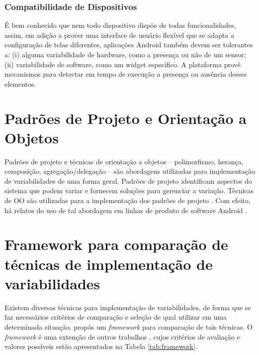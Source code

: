 \subsubsection{Compatibilidade de Dispositivos}

É bem conhecido que nem todo dispositivo dispõe de todas funcionalidades, assim,
em adição a prover uma interface de usuário flexível que se adapta a configuração
de telas diferentes, aplicações Android também devem ser tolerantes a: (i) alguma
variabilidade de hardware, como a presença ou não de um sensor; (ii) variabilidade
de software, como um widget específico. A plataforma provê mecanismos para detectar
em tempo de execução a presença ou ausência desses elementos.

\section{Padrões de Projeto e Orientação a Objetos}
Padrões de projeto \cite{Gamma1994} e técnicas de orientação a objetos – polimorfismo,
herança, composição, agregação/delegação – são abordagens utilizadas para implementação
de variabilidades de uma forma geral. Padrões de projeto identificam aspectos do sistema
que podem variar e fornecem soluções para gerenciar a variação. Técnicas de OO
são utilizadas para a implementação dos padrões de projeto \cite{Gacek2001}.
Com efeito, há relatos do uso de tal abordagem em linhas de produto de software Android \cite{Pavlic2013}.

\section{Framework para comparação de técnicas de implementação de variabilidades}
Existem diversas técnicas para implementação de variabilidades, de forma que se
faz necessários critérios de comparação e seleção de qual utilizar em uma determinada
situação.  propôs um \textit{framework} para comparação de tais técnicas.
O \textit{framework} é uma extenção de outros trabalhos \cite{Gacek2001} \cite{Coplien1999},
cujos critérios de avaliação e valores possíveis estão apresentados na Tabela \ref{tab:framework}.

